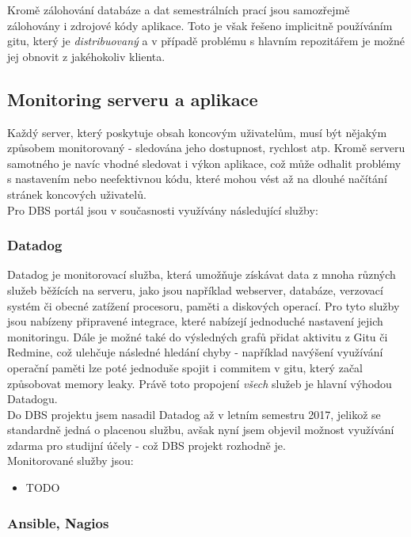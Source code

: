 Kromě zálohování databáze a dat semestrálních prací jsou samozřejmě zálohovány i zdrojové kódy aplikace. Toto je však řešeno implicitně používáním gitu, který je \emph{distribuovaný} a v případě problému s hlavním repozitářem je možné jej obnovit z jakéhokoliv klienta.

\subsection{Monitoring serveru a aplikace}

Každý server, který poskytuje obsah koncovým uživatelům, musí být nějakým způsobem monitorovaný - sledována jeho dostupnost, rychlost atp. Kromě serveru samotného je navíc vhodné sledovat i výkon aplikace, což může odhalit problémy s nastavením nebo neefektivnou kódu, které mohou vést až na dlouhé načítání stránek koncových uživatelů.\\
Pro DBS portál jsou v současnosti využívány následující služby:

\subsubsection{Datadog}

Datadog \cite{datadog} je monitorovací služba, která umožňuje získávat data z mnoha různých služeb běžících na serveru, jako jsou například webserver, databáze, verzovací systém či obecné zatížení procesoru, paměti a diskových operací. Pro tyto služby jsou nabízeny připravené integrace, které nabízejí jednoduché nastavení jejich monitoringu. Dále je možné také do výsledných grafů přidat aktivitu z Gitu či Redmine, což ulehčuje následné hledání chyby - například navýšení využívání operační paměti lze poté jednoduše spojit i commitem v gitu, který začal způsobovat memory leaky. Právě toto propojení \emph{všech} služeb je hlavní výhodou Datadogu.\\

Do DBS projektu jsem nasadil Datadog až v letním semestru 2017, jelikož se standardně jedná o placenou službu, avšak nyní jsem objevil možnost využívání zdarma pro studijní účely - což DBS projekt rozhodně je.\\
Monitorované služby jsou:
\begin{itemize}
	\item TODO
\end{itemize}

\subsubsection{Ansible, Nagios}

